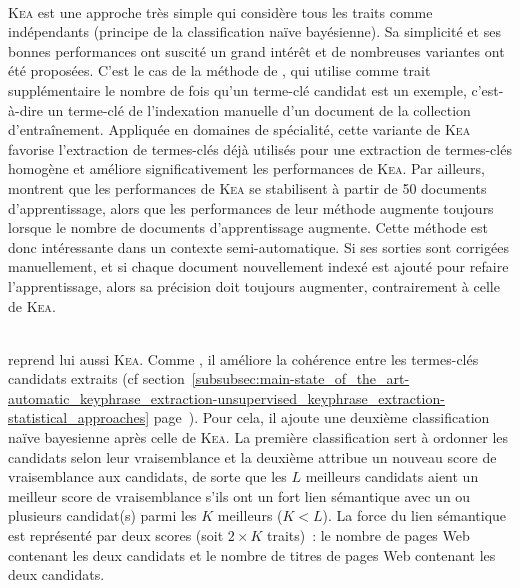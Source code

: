         ~\\\textsc{Kea} est une approche très simple qui considère tous les
        traits comme indépendants (principe de la classification naïve
        bayésienne). Sa simplicité et ses bonnes performances ont suscité un
        grand intérêt et de nombreuses variantes ont été proposées. C'est le cas
        de la méthode de , qui utilise comme
        trait supplémentaire le nombre de fois qu'un terme-clé candidat est un
        exemple, c'est-à-dire un terme-clé de l'indexation manuelle d'un
        document de la collection d'entraînement. Appliquée
        en domaines de spécialité, cette variante de \textsc{Kea} favorise
        l'extraction de termes-clés déjà utilisés pour une extraction de
        termes-clés homogène et améliore significativement les performances de
        \textsc{Kea}. Par ailleurs,  montrent que
        les performances de \textsc{Kea} se stabilisent à partir de 50 documents
        d'apprentissage, alors que les performances de leur méthode augmente
        toujours lorsque le nombre de documents d'apprentissage augmente. Cette
        méthode est donc intéressante dans un contexte semi-automatique. Si ses
        sorties sont corrigées manuellement,
        et si chaque document nouvellement indexé est ajouté pour refaire
        l'apprentissage, alors sa précision doit toujours augmenter, contrairement à
        celle de \textsc{Kea}.
        
        ~\\ reprend lui aussi \textsc{Kea}.
        Comme , il améliore la
        cohérence entre les termes-clés candidats extraits (cf
        section~\ref{subsubsec:main-state_of_the_art-automatic_keyphrase_extraction-unsupervised_keyphrase_extraction-statistical_approaches}
        page~\pageref{subsubsec:main-state_of_the_art-automatic_keyphrase_extraction-unsupervised_keyphrase_extraction-statistical_approaches:ilp}).
        Pour cela,
        il ajoute une deuxième classification naïve bayesienne après celle de
        \textsc{Kea}. La première classification sert à ordonner les candidats
        selon leur vraisemblance et la deuxième attribue un nouveau score de
        vraisemblance aux candidats, de sorte que les $L$ meilleurs candidats
        aient un meilleur score de vraisemblance s'ils ont un fort lien
        sémantique avec un ou plusieurs candidat(s) parmi les $K$ meilleurs ($K
        < L$). La force du lien sémantique est représenté par deux scores (soit
        $2 \times K$ traits)~: le nombre de pages Web contenant les deux
        candidats et le nombre de titres de pages Web contenant les deux
        candidats.

